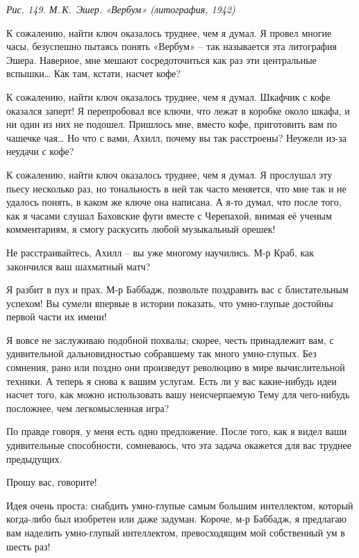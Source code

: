 \documentclass[../main.tex]{subfiles}
\begin{document}
\begin{dialogue}
\emph{Рис. 149. М.\,К.~Эшер. «Вербум» (литография, 1942)}

 К сожалению, найти ключ оказалось труднее, чем я думал. Я провел многие часы, безуспешно пытаясь понять «Вербум» \--- так называется эта литография Эшера. Наверное, мне мешают сосредоточиться как раз эти центральные вспышки\ldots{} Как там, кстати, насчет кофе?

 К сожалению, найти ключ оказалось труднее, чем я думал. Шкафчик с кофе оказался заперт! Я перепробовал все ключи, что лежат в коробке около шкафа, и ни один из них не подошел. Пришлось мне, вместо кофе, приготовить вам по чашечке чая\ldots{} Но что с вами, Ахилл, почему вы так расстроены? Неужели из-за неудачи с кофе?

 К сожалению, найти ключ оказалось труднее, чем я думал. Я прослушал эту пьесу несколько раз, но тональность в ней так часто меняется, что мне так и не удалось понять, в каком же ключе она написана. А я-то думал, что после того, как я часами слушал Баховские фуги вместе с Черепахой, внимая её ученым комментариям, я смогу раскусить любой музыкальный орешек!

 Не расстраивайтесь, Ахилл \--- вы уже многому научились. М-р Краб, как закончился ваш шахматный матч?

 Я разбит в пух и прах. М-р Баббадж, позвольте поздравить вас с блистательным успехом! Вы сумели впервые в истории показать, что умно-глупые достойны первой части их имени!

 Я вовсе не заслуживаю подобной похвалы; скорее, честь принадлежит вам, с удивительной дальновидностью собравшему так много умно-глупых. Без сомнения, рано или поздно они произведут революцию в мире вычислительной техники. А теперь я снова к вашим услугам. Есть ли у вас какие-нибудь идеи насчет того, как можно использовать вашу неисчерпаемую Тему для чего-нибудь посложнее, чем легкомысленная игра?

 По правде говоря, у меня есть одно предложение. После того, как я видел ваши удивительные способности, сомневаюсь, что эта задача окажется для вас труднее предыдущих.

 Прошу вас, говорите!

 Идея очень проста: снабдить умно-глупые самым большим интеллектом, который когда-либо был изобретен или даже задуман. Короче, м-р Баббадж, я предлагаю вам наделить умно-глупый интеллектом, превосходящим мой собственный ум в шесть раз!


\end{dialogue}
\end{document}
